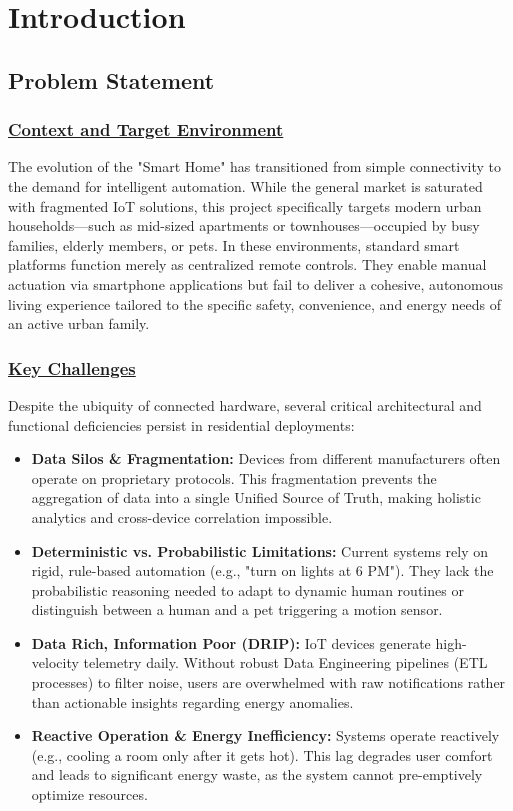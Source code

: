 \newpage

\section{Introduction}

\subsection{Problem Statement}

\subsubsection*{\underline{Context and Target Environment}}
The evolution of the "Smart Home" has transitioned from simple connectivity to the demand for intelligent automation. While the general market is saturated with fragmented IoT solutions, this project specifically targets modern urban households—such as mid-sized apartments or townhouses—occupied by busy families, elderly members, or pets. In these environments, standard smart platforms function merely as centralized remote controls. They enable manual actuation via smartphone applications but fail to deliver a cohesive, autonomous living experience tailored to the specific safety, convenience, and energy needs of an active urban family.

\subsubsection*{\underline{Key Challenges}}
Despite the ubiquity of connected hardware, several critical architectural and functional deficiencies persist in residential deployments:

\begin{itemize}
  \item \textbf{Data Silos \& Fragmentation:} Devices from different manufacturers often operate on proprietary protocols. This fragmentation prevents the aggregation of data into a single Unified Source of Truth, making holistic analytics and cross-device correlation impossible. \cite{nxp_matter_standard_2021}
  \item \textbf{Deterministic vs. Probabilistic Limitations:} Current systems rely on rigid, rule-based automation (e.g., "turn on lights at 6 PM"). They lack the probabilistic reasoning needed to adapt to dynamic human routines or distinguish between a human and a pet triggering a motion sensor.
  \item \textbf{Data Rich, Information Poor (DRIP):} IoT devices generate high-velocity telemetry daily. Without robust Data Engineering pipelines (ETL processes) to filter noise, users are overwhelmed with raw notifications rather than actionable insights regarding energy anomalies.
  \item \textbf{Reactive Operation \& Energy Inefficiency:} Systems operate reactively (e.g., cooling a room only after it gets hot). This lag degrades user comfort and leads to significant energy waste, as the system cannot pre-emptively optimize resources.
\end{itemize}


